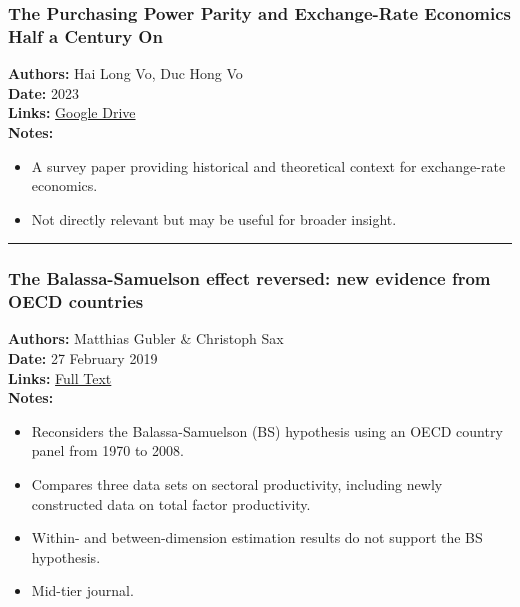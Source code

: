 \documentclass[
  11pt,
]{article}
\providecommand{\tightlist}{%
  \setlength{\itemsep}{0pt}\setlength{\parskip}{0pt}}
\begin{document}
\subsubsection{The Purchasing Power Parity and Exchange-Rate Economics
Half a Century
On}\label{the-purchasing-power-parity-and-exchange-rate-economics-half-a-century-on}

\textbf{Authors:} Hai Long Vo, Duc Hong Vo\\
\textbf{Date:} 2023\\
\textbf{Links:}
\href{https://drive.google.com/file/d/1GvSoUtKJiy58EFfif0aoFeuvEYS26tqs/view?usp=sharing}{Google
Drive}\\
\textbf{Notes:}

\begin{itemize}
\tightlist
\item
  A survey paper providing historical and theoretical context for
  exchange-rate economics.\\
\item
  Not directly relevant but may be useful for broader insight.
\end{itemize}

\begin{center}\rule{0.5\linewidth}{0.5pt}\end{center}

\subsubsection{The Balassa-Samuelson effect reversed: new evidence from
OECD
countries}\label{the-balassa-samuelson-effect-reversed-new-evidence-from-oecd-countries}

\textbf{Authors:} Matthias Gubler \& Christoph Sax\\
\textbf{Date:} 27 February 2019\\
\textbf{Links:}
\href{https://drive.google.com/file/d/1_555bkCnPqh45YBhcRcNZMX4dL5exJOW/view?usp=sharing}{Full
Text}\\
\textbf{Notes:}

\begin{itemize}
\tightlist
\item
  Reconsiders the Balassa-Samuelson (BS) hypothesis using an OECD
  country panel from 1970 to 2008.
\item
  Compares three data sets on sectoral productivity, including newly
  constructed data on total factor productivity.
\item
  Within- and between-dimension estimation results do not support the BS
  hypothesis.
\item
  Mid-tier journal.
\end{itemize}
\end{document}
